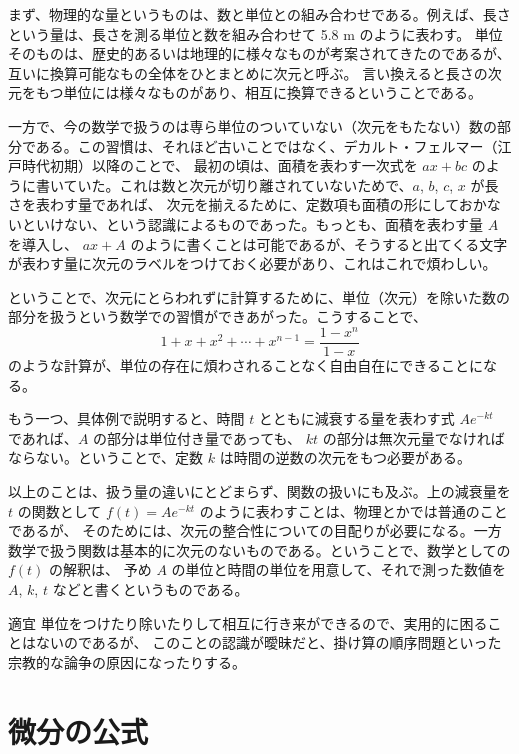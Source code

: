 \documentclass[a4paper]{jsarticle}
\theoremstyle{definition}
\theoremstyle{remark}
\begin{document}
まず、物理的な量というものは、数と単位との組み合わせである。例えば、長さという量は、長さを測る単位と数を組み合わせて 5.8 m のように表わす。
単位そのものは、歴史的あるいは地理的に様々なものが考案されてきたのであるが、互いに換算可能なもの全体をひとまとめに次元と呼ぶ。
言い換えると長さの次元をもつ単位には様々なものがあり、相互に換算できるということである。

一方で、今の数学で扱うのは専ら単位のついていない（次元をもたない）数の部分である。この習慣は、それほど古いことではなく、デカルト・フェルマー（江戸時代初期）以降のことで、
最初の頃は、面積を表わす一次式を $ax + bc$ のように書いていた。これは数と次元が切り離されていないためで、$a$, $b$, $c$, $x$ が長さを表わす量であれば、
次元を揃えるために、定数項も面積の形にしておかないといけない、という認識によるものであった。もっとも、面積を表わす量 $A$ を導入し、
$ax + A$ のように書くことは可能であるが、そうすると出てくる文字が表わす量に次元のラベルをつけておく必要があり、これはこれで煩わしい。

ということで、次元にとらわれずに計算するために、単位（次元）を除いた数の部分を扱うという数学での習慣ができあがった。こうすることで、
\[
  1 + x + x^2 + \cdots + x^{n-1} = \frac{1 - x^n}{1-x}
\]
のような計算が、単位の存在に煩わされることなく自由自在にできることになる。

もう一つ、具体例で説明すると、時間 $t$ とともに減衰する量を表わす式 $A e^{-kt}$ であれば、$A$ の部分は単位付き量であっても、
$kt$ の部分は無次元量でなければならない。ということで、定数 $k$ は時間の逆数の次元をもつ必要がある。

以上のことは、扱う量の違いにとどまらず、関数の扱いにも及ぶ。上の減衰量を $t$ の関数として $f(t) = A e^{-kt}$ のように表わすことは、物理とかでは普通のことであるが、
そのためには、次元の整合性についての目配りが必要になる。一方数学で扱う関数は基本的に次元のないものである。ということで、数学としての $f(t)$ の解釈は、
予め $A$ の単位と時間の単位を用意して、それで測った数値を $A$, $k$, $t$ などと書くというものである。

適宜 単位をつけたり除いたりして相互に行き来ができるので、実用的に困ることはないのであるが、
このことの認識が曖昧だと、掛け算の順序問題といった宗教的な論争の原因になったりする。


\section{微分の公式}
\end{document}
